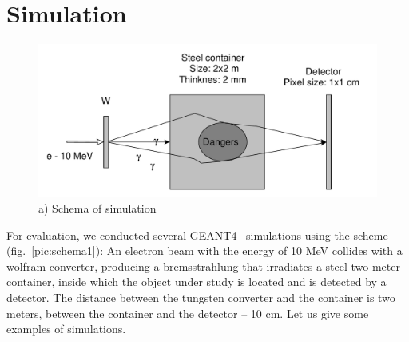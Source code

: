 \documentclass[a4paper]{panl}
\begin{document}
\section*{Simulation}
\begin{figure}[t]
    \begin{center}
        \includegraphics[width=120mm]{figures/yed_schema_1.pdf}
        \vspace{-3mm}
        \caption{a) Schema of simulation}
    \end{center}
    \vspace{-5mm}
\end{figure}
For evaluation, we conducted several GEANT4~\cite{ALLISON2016186} simulations using the scheme (fig.~\ref{pic:schema1}):
An electron beam with the energy of 10 MeV collides with a wolfram converter, producing a bremsstrahlung that irradiates a steel two-meter container, inside which the object under study is located and is detected by a detector. The distance between the tungsten converter and the container is two meters, between the container and the detector -- 10 cm. Let us give some examples of simulations.
\end{document}
